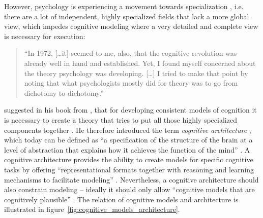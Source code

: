 However, psychology is experiencing a movement towards specialization \cite{anderson_integrated_2004}, i.e. there are a lot of independent, highly specialized fields that lack a more global view, which impedes cognitive modeling where a very detailed and complete view is necessary for execution:

\begin{quote}
``In 1972, [\dots it] seemed to me, also, that the cognitive revolution was already well in hand and established. Yet, I found myself concerned about the theory psychology was developing. [\dots] I tried to make that point by noting that what psychologists mostly did for theory was to go from dichotomy to dichotomy.'' \cite[1\psq]{newell_unified_1990}
\end{quote}

\citeauthor{newell_unified_1990} suggested in his book from \citeyear{newell_unified_1990} \cite{newell_unified_1990}, that for developing consistent models of cognition it is necessary to create a theory that tries to put all those highly specialized components together \cite[1036]{anderson_integrated_2004}. He therefore introduced the term \emph{cognitive architecture} \cite[5]{anderson_how_2007}, which today can be defined as ``a specification of the structure of the brain at a level of abstraction that explains how it achieves the function of the mind'' \cite[7]{anderson_how_2007}. A cognitive architecture provides the ability to create models for specific cognitive tasks \cite[29]{taatgen_modeling_2006} by offering ``representational formats together with reasoning and learning mechanisms to facilitate modeling'' \cite[29]{taatgen_modeling_2006}. Nevertheless, a cognitive architecture should also constrain modeling -- ideally it should only allow ``cognitive models that are cognitively plausible'' \cite[29]{taatgen_modeling_2006}. The relation of cognitive models and architecture is illustrated in figure~\ref{fig:cognitive_models_architecture}.

